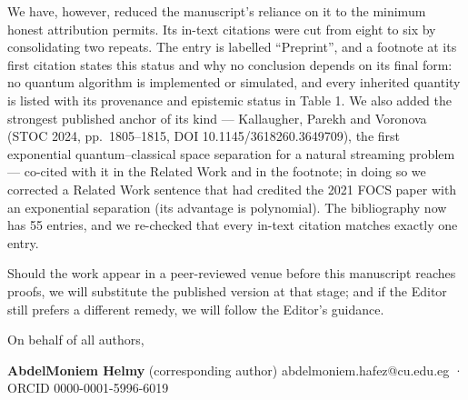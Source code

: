 \documentclass[
  11pt,
]{article}
\begin{document}
We have, however, reduced the manuscript's reliance on it to the minimum
honest attribution permits. Its in-text citations were cut from eight to
six by consolidating two repeats. The entry is labelled ``Preprint'',
and a footnote at its first citation states this status and why no
conclusion depends on its final form: no quantum algorithm is
implemented or simulated, and every inherited quantity is listed with
its provenance and epistemic status in Table 1. We also added the
strongest published anchor of its kind --- Kallaugher, Parekh and
Voronova (STOC 2024, pp.~1805--1815, DOI 10.1145/3618260.3649709), the
first exponential quantum--classical space separation for a natural
streaming problem --- co-cited with it in the Related Work and in the
footnote; in doing so we corrected a Related Work sentence that had
credited the 2021 FOCS paper with an exponential separation (its
advantage is polynomial). The bibliography now has 55 entries, and we
re-checked that every in-text citation matches exactly one entry.

Should the work appear in a peer-reviewed venue before this manuscript
reaches proofs, we will substitute the published version at that stage;
and if the Editor still prefers a different remedy, we will follow the
Editor's guidance.

On behalf of all authors,

\textbf{AbdelMoniem Helmy} (corresponding author)
abdelmoniem.hafez@cu.edu.eg · ORCID 0000-0001-5996-6019
\end{document}
